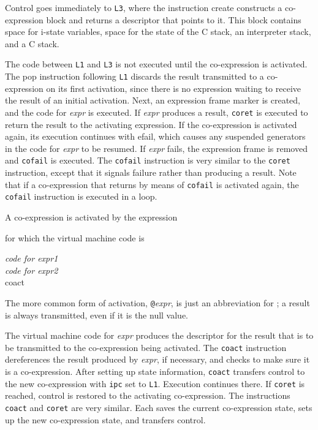 Control goes immediately to \texttt{L3}, where the instruction create
constructs a co-expression block and returns a descriptor that points
to it. This block contains space for i-state variables, space for the
state of the C stack, an interpreter stack, and a C stack.

The code between \texttt{L1} and \texttt{L3} is not executed until the
co-expression is activated. The pop instruction following \texttt{L1}
discards the result transmitted to a co-expression on its first
activation, since there is no expression waiting to receive the result
of an initial activation. Next, an expression frame marker is created,
and the code for \textit{expr} is executed. If
\textit{expr} produces a result, \texttt{coret} is
executed to return the result to the activating expression. If the
co-expression is activated again, its execution continues with efail,
which causes any suspended generators in the code for
\textit{expr} to be resumed. If
\textit{expr} fails, the expression frame is removed
and \texttt{cofail} is executed. The \texttt{cofail} instruction is
very similar to the \texttt{coret} instruction, except that it signals
failure rather than producing a result. Note that if a co-expression
that returns by means of \texttt{cofail} is activated again, the
\texttt{cofail} instruction is executed in a loop.

A co-expression is activated by the expression


\noindent for which the virtual machine code is

\begin{iconcode}
\>\textit{code for expr1}\\
\>\textit{code for expr2}\\
\>coact\\
\end{iconcode}

The more common form of activation,
\texttt{@}\textit{expr}, is just an abbreviation for
; a result is always
transmitted, even if it is the null value.

The virtual machine code for \textit{expr} produces
the descriptor for the result that is to be transmitted to the
co-expression being activated. The \texttt{coact} instruction
dereferences the result produced by \textit{expr}, if
necessary, and checks to make sure it is a co-expression. After
setting up state information, \texttt{coact} transfers control to the
new co-expression with \texttt{ipc} set to \texttt{L1}. Execution
continues there. If \texttt{coret} is reached, control is restored to
the activating co-expression. The instructions \texttt{coact} and
\texttt{coret} are very similar. Each saves the current co-expression
state, sets up the new co-expression state, and transfers control.

